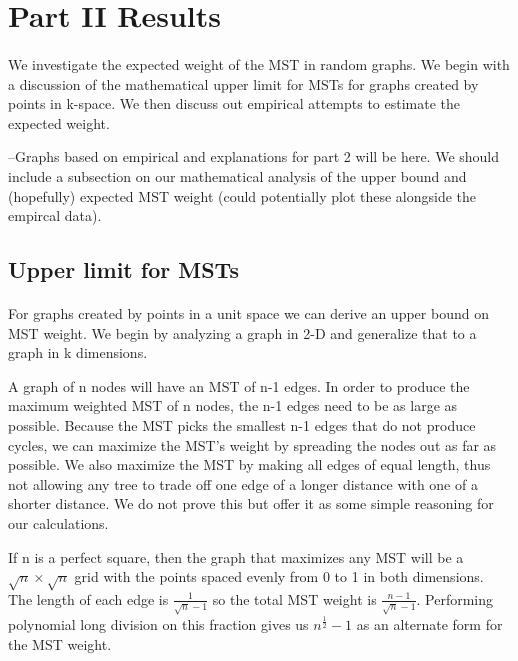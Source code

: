 \section{Part II Results}
\label{sec:part2}

\paragraph{}
We investigate the expected weight of the MST in random graphs. We begin
with a discussion of the mathematical upper limit for MSTs for graphs
created by points in k-space. We then discuss out empirical attempts to
estimate the expected weight.

--Graphs based on empirical and explanations for part 2 will be here.  We should
include a subsection on our mathematical analysis of the upper bound and
(hopefully) expected MST weight (could potentially plot these alongside the
empircal data).

\subsection{Upper limit for MSTs}
\paragraph{}
For graphs created by points in a unit space we can derive an upper bound on
MST weight. We begin by analyzing a graph in 2-D and generalize that to a
graph in k dimensions.

A graph of n nodes will have an MST of n-1 edges. In order to produce
the maximum weighted MST of n nodes, the n-1 edges need to be as large as
possible. Because the MST picks the smallest n-1 edges that do not produce
cycles, we can maximize the MST's weight by spreading the nodes out as far
as possible. We also maximize the MST by making all edges of equal length,
thus not allowing any tree to trade off one edge of a longer distance with
one of a shorter distance. We do not prove this but offer it as some
simple reasoning for our calculations.

If n is a perfect square, then the graph that
maximizes any MST will be a $\sqrt{n} \times \sqrt{n}$ grid with the
points spaced evenly from 0 to 1 in both dimensions. The length of each
edge is $\frac{1}{\sqrt{n}-1}$ so the total MST weight is
$\frac{n-1}{\sqrt{n}-1}$. Performing polynomial long division on this
fraction gives us $n^{\frac{1}{2}}-1$ as an alternate form for the MST
weight.

